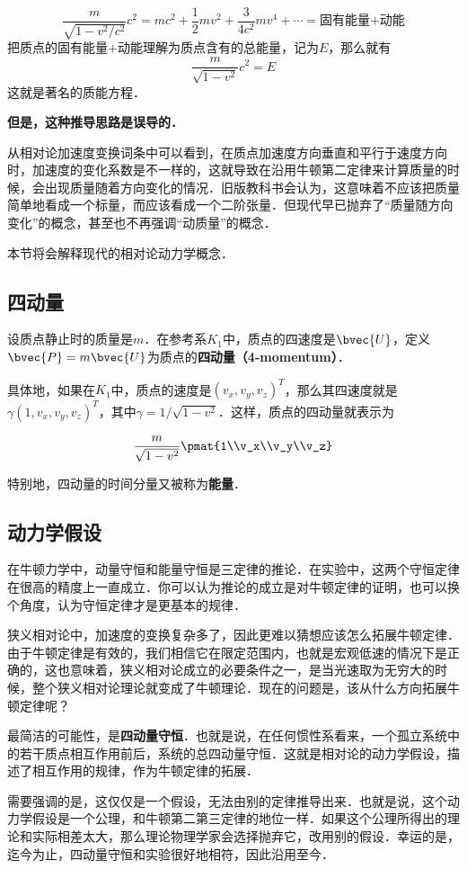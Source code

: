 \begin{equation}
\frac{m}{\sqrt{1-v^2/c^2}}c^2=mc^2+\frac{1}{2}mv^2+\frac{3}{4c^2}mv^4+\cdots=\text{固有能量+动能}
\end{equation}
把质点的固有能量+动能理解为质点含有的总能量，记为$E$，那么就有
\begin{equation}
\frac{m}{\sqrt{1-v^2}}c^2=E
\end{equation}
这就是著名的质能方程．

\textbf{但是，这种推导思路是误导的．}


从相对论加速度变换词条中可以看到，在质点加速度方向垂直和平行于速度方向时，加速度的变化系数是不一样的，这就导致在沿用牛顿第二定律来计算质量的时候，会出现质量随着方向变化的情况．旧版教科书会认为，这意味着不应该把质量简单地看成一个标量，而应该看成一个二阶张量．但现代早已抛弃了“质量随方向变化”的概念，甚至也不再强调“动质量”的概念．

本节将会解释现代的相对论动力学概念．

\subsection{四动量}

设质点静止时的质量是$m$．在参考系$K_1$中，质点的四速度是$\bvec{U}$，定义$\bvec{P}=m\bvec{U}$为质点的\textbf{四动量（4-momentum）}．

具体地，如果在$K_1$中，质点的速度是$(v_x, v_y, v_z)^T$，那么其四速度就是$\gamma(1, v_x, v_y, v_z)^T$，其中$\gamma=1/\sqrt{1-v^2}$．这样，质点的四动量就表示为

\begin{equation}
\frac{m}{\sqrt{1-v^2}}\pmat{1\\v_x\\v_y\\v_z}
\end{equation}

特别地，四动量的时间分量又被称为\textbf{能量}．


\subsection{动力学假设}

在牛顿力学中，动量守恒和能量守恒是三定律的推论．在实验中，这两个守恒定律在很高的精度上一直成立．你可以认为推论的成立是对牛顿定律的证明，也可以换个角度，认为守恒定律才是更基本的规律．

狭义相对论中，加速度的变换复杂多了，因此更难以猜想应该怎么拓展牛顿定律．由于牛顿定律是有效的，我们相信它在限定范围内，也就是宏观低速的情况下是正确的，这也意味着，狭义相对论成立的必要条件之一，是当光速取为无穷大的时候，整个狭义相对论理论就变成了牛顿理论．现在的问题是，该从什么方向拓展牛顿定律呢？

最简洁的可能性，是\textbf{四动量守恒}．也就是说，在任何惯性系看来，一个孤立系统中的若干质点相互作用前后，系统的总四动量守恒．这就是相对论的动力学假设，描述了相互作用的规律，作为牛顿定律的拓展．

需要强调的是，这仅仅是一个假设，无法由别的定律推导出来．也就是说，这个动力学假设是一个公理，和牛顿第二第三定律的地位一样．如果这个公理所得出的理论和实际相差太大，那么理论物理学家会选择抛弃它，改用别的假设．幸运的是，迄今为止，四动量守恒和实验很好地相符，因此沿用至今．




